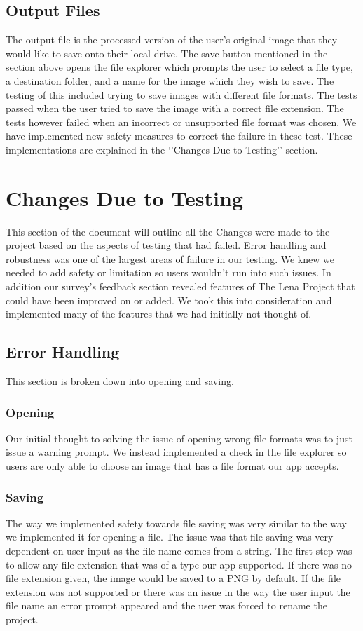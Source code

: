 \documentclass[12pt, titlepage]{article}
\begin{document}
\subsection{Output Files}
The output file is the processed version of the user’s original image that they would like to save onto their local drive. The save button mentioned in the section above opens the file explorer which prompts the user to select a file type, a destination folder, and a name for the image which they wish to save. The testing of this included trying to save images with different file formats. The tests passed when the user tried to save the image with a correct file extension. The tests however failed when an incorrect or unsupported file format was chosen. We have implemented new safety measures to correct the failure in these test. These implementations are explained in the ‘’Changes Due to Testing’’ section. 

\section{Changes Due to Testing}
This section of the document will outline all the Changes were made to the project based on the aspects of testing that had failed. Error handling and robustness was one of the largest areas of failure in our testing. We knew we needed to add safety or limitation so users wouldn’t run into such issues. In addition our survey’s feedback section revealed features of The Lena Project that could have been improved on or added. We took this into consideration and implemented many of the features that we had initially not thought of.

\subsection{Error Handling}
This section is broken down into opening and saving.

\subsubsection{Opening}
Our initial thought to solving the issue of opening wrong file formats was to just issue a warning prompt. We instead implemented a check in the file explorer so users are only able to choose an image that has a file format our app accepts.

\subsubsection{Saving}
The way we implemented safety towards file saving was very similar to the way we implemented it for opening a file. The issue was that file saving was very dependent on user input as the file name comes from a string. The first step was to allow any file extension that was of a type our app supported. If there was no file extension given, the image would be saved to a PNG by default. If the file extension was not supported or there was an issue in the way the user input the file name an error prompt appeared and the user was forced to rename the project.
\end{document}
